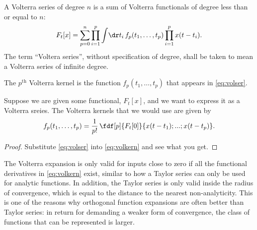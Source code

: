 \documentclass[12pt]{article}
\begin{document}
\begin{defn}
  A Volterra series of degree $n$ is a sum of Volterra functionals of degree less than or equal to $n$:
  \begin{equation}\label{eq:volser}
    F_t[x] = \sum_{p=0}^n\prod_{i=1}^p \int\!\dr t_i\,  f_p(t_1,\ldots,t_p) \prod_{i=1}^p x(t-t_i).
  \end{equation}
  The term ``Voltera series'', without specification of degree, shall be taken to mean a Volterra series of infinite degree.
\end{defn}

\begin{defn}
  The $p^{\text{th}}$ Volterra kernel is the function $f_p(t_1,\ldots,t_p)$ that appears in \eqref{eq:volser}.
\end{defn}

\begin{thm}
  Suppose we are given some functional, $F_t[x]$, and we want to express it as a Volterra sreies.
  The Volterra kernels that we would use are given by
  \begin{equation}\label{eq:volkern}
    f_p(t_1,\ldots,t_p) = \frac{1}{p!}\, \fdf[p]{F_t[0]}{x(t-t_1);...;x(t-t_p)}.
  \end{equation}
\end{thm}
\begin{proof}
  Substitute \eqref{eq:volser} into \eqref{eq:volkern} and see what you get.
\end{proof}

The Volterra expansion is only valid for inputs close to zero if all the functional derivatives in \eqref{eq:volkern} exist, similar to how a Taylor series can only be used for analytic functions.
In addition, the Taylor series is only valid inside the radius of convergence, which is equal to the distance to the nearest non-analyticity.
This is one of the reasons why orthogonal function expansions are often better than Taylor series: in return for demanding a weaker form of convergence, the class of functions that can be represented is larger.
\end{document}

